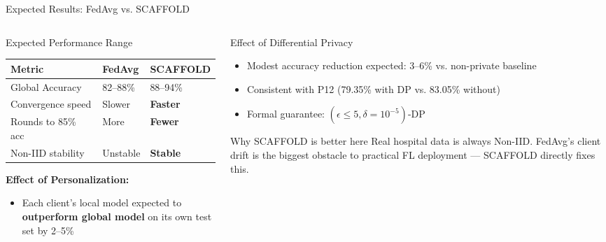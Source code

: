 \documentclass[aspectratio=169, 11pt]{beamer}
\begin{document}
\begin{frame}{Expected Results: FedAvg vs. SCAFFOLD}
  \begin{columns}[T]
    \begin{column}{0.50\textwidth}
      \begin{block}{Expected Performance Range}
        \small\renewcommand{\arraystretch}{1.2}
        \begin{tabular}{lll}
          \textbf{Metric} & \textbf{FedAvg} & \textbf{SCAFFOLD} \\
          \hline
          Global Accuracy & 82--88\% & 88--94\% \\
          Convergence speed & Slower & \textbf{Faster} \\
          Rounds to 85\% acc & More & \textbf{Fewer} \\
          Non-IID stability & Unstable & \textbf{Stable} \\
        \end{tabular}
      \end{block}
      \vspace{4pt}
      \textbf{Effect of Personalization:}
      \begin{itemize}\small
        \item Each client's local model expected to \textbf{outperform global model} on its own test set by 2--5\%
      \end{itemize}
    \end{column}
    \begin{column}{0.47\textwidth}
      \begin{block}{Effect of Differential Privacy}\small
        \begin{itemize}
          \item Modest accuracy reduction expected: 3--6\% vs. non-private baseline
          \item Consistent with P12 (79.35\% with DP vs. 83.05\% without)
          \item Formal guarantee: $(\epsilon \leq 5, \delta = 10^{-5})$-DP
        \end{itemize}
      \end{block}
      \vspace{4pt}
      \begin{exampleblock}{Why SCAFFOLD is better here}\small
        Real hospital data is always Non-IID. FedAvg's client drift is the biggest obstacle to practical FL deployment --- SCAFFOLD directly fixes this.
      \end{exampleblock}
    \end{column}
  \end{columns}
\end{frame}
\end{document}

